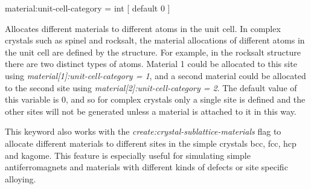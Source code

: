 
{\zicf material:unit-cell-category = int [ default 0 ]} Allocates different materials to different atoms in the unit cell. In complex crystals such as spinel and rocksalt, the material allocations of
different atoms in the unit cell are defined by the structure. For example, in the rocksalt structure there are two distinct types of atoms. Material 1 could be allocated to this site using \textit{material[1]:unit-cell-category = 1}, and a second material could be allocated to the second site using
\textit{material[2]:unit-cell-category = 2}. The default value of this variable is 0, and so for complex crystals only a single site is defined and the other sites will not be generated unless a material is attached to it in this way.

This keyword also works with the \textit{create:crystal-sublattice-materials} flag to allocate different materials to different sites in the simple crystals bcc, fcc, hcp and kagome. This feature is especially useful for simulating simple antiferromagnets and materials with different kinds of defects or site specific alloying.










%
